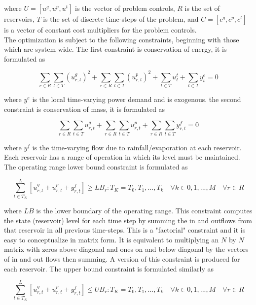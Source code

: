 \documentclass[12pt]{article}
\begin{document}
where $U=[u^g,u^p,u^t]$ is the vector of problem controls, $R$ is the set of reservoirs, $T$ is the set of discrete time-steps of the problem, and $C=[c^g,c^p,c^t]$ is a vector of constant cost multipliers for the problem controls.\\

The optimization is subject to the following constraints, beginning with those which are system wide. The first constraint is conservation of energy, it is formulated as

\begin{equation}
	\sum_{r\in R}\sum_{t\in T}(u_{r,t}^{g})^2+
	\sum_{r\in R}\sum_{t\in T}(u_{r,t}^{p})^2+
	\sum_{t\in T}u_{t}^{t}+
	\sum_{t\in T}y_{t}^{e}=0\label{eq:coe}
\end{equation}

where $y^e$ is the local time-varying power demand and is exogenous. the second constraint is conservation of mass, it is formulated as

\begin{equation}
	\sum_{r\in R}\sum_{t\in T}u_{r,t}^{g}+
	\sum_{r\in R}\sum_{t\in T}u_{r,t}^{p}+
	\sum_{r\in R}\sum_{t\in T}y_{r,t}^{f}=0\label{eq:com}
\end{equation}

where $y^f$ is the time-varying flow due to rainfall/evaporation at each reservoir.\\

Each reservoir has a range of operation in which its level must be maintained. The operating range lower bound constraint is formulated as

\begin{equation}
	\sum_{t\in T_K}^{L}[u_{r,t}^{g}+u_{r,t}^{p}+y_{r,t}^{f}]\geq LB_{r} : T_K=T_0,T_1,...,T_k \quad\forall k \in 0,1,...,M \quad\forall r \in R \label{eq:lb}
\end{equation}

where $LB$ is the lower boundary of the operating range. This constraint computes the state (reservoir) level for each time step by summing the in and outflows from that reservoir in all previous time-steps. This is a "factorial" constraint and it is easy to conceptualize in matrix form. It is equivalent to multiplying an $N$ by $N$ matrix with zeros above diagonal and ones on and below diagonal by the vectors of in and out flows then summing. A version of this constraint is produced for each reservoir. The upper bound constraint is formulated similarly as

\begin{equation}
	\sum_{t\in T_K}^{L}[u_{r,t}^{g}+u_{r,t}^{p}+y_{r,t}^{f}]\leq UB_{r} : T_K=T_0,T_1,...,T_k \quad\forall k \in 0,1,...,M \quad\forall r \in R \label{eq:ub}
\end{equation}
\end{document}
